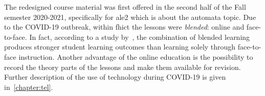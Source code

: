 The redesigned course material was first offered in the second half of the Fall semester 2020-2021, specifically for \acrshort{ale}2 which is about the automata topic. 
Due to the COVID-19 outbreak, within \acrshort{fhict} the lessons were \textit{blended}: online and face-to-face. In fact, according to a study by~\citet{blended2013}, the combination of blended learning produces stronger student learning outcomes than learning solely through face-to-face instruction. Another advantage of the online education is the possibility to record the theory parts of the lessons and make them available for revision. Further description of the use of technology during COVID-19 is given in~\cref{chapter:tel}.

